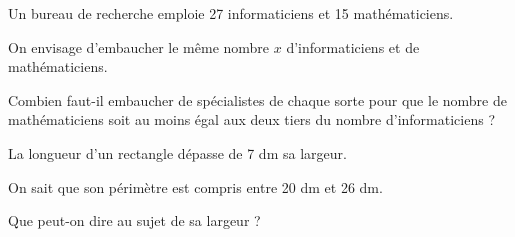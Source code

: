 \begin{exercice}[]
Un bureau de recherche emploie 27 informaticiens et 15 mathématiciens. 

On envisage d’embaucher le même nombre $x$  d’informaticiens et de mathématiciens.

Combien faut-il embaucher de spécialistes de chaque sorte pour que le nombre de mathématiciens soit au moins égal aux deux tiers du nombre d’informaticiens ?\\
\end{exercice}

\begin{exercice}[]
La longueur d’un rectangle dépasse de 7 dm sa largeur. 

On sait que son périmètre est compris entre 20 dm et 26 dm. 

Que peut-on dire au sujet de sa largeur ?

\end{exercice}
